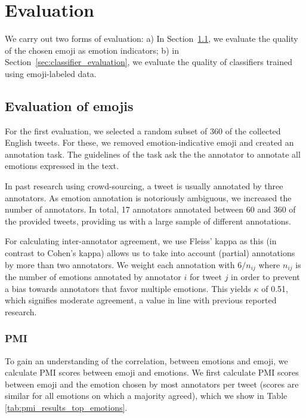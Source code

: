 \documentclass[10pt, a4paper]{article}
\begin{document}
\section{Evaluation}
\label{sec:evaluation}
We carry out two forms of evaluation: a) In Section~\ref{sec:emoji_evaluation}, we evaluate the quality of the chosen emoji as emotion indicators; b) in Section~\ref{sec:classifier_evaluation}, we evaluate the quality of classifiers trained using emoji-labeled data.

\subsection{Evaluation of emojis}
\label{sec:emoji_evaluation}

For the first evaluation, we selected a random subset of 360 of the collected English tweets. For these, we removed emotion-indicative emoji and created an annotation task. The guidelines of the task ask the the annotator to annotate all emotions expressed in the text.

In past research using crowd-sourcing, a tweet is usually annotated by three annotators. As emotion annotation is notoriously ambiguous, we increased the number of annotators. In total, 17 annotators annotated between 60 and 360 of the provided tweets, providing us with a large sample of different annotations.

For calculating inter-annotator agreement, we use Fleiss' kappa as this (in contrast to Cohen's kappa) allows us to take into account (partial) annotations by more than two annotators. We weight each annotation with $ 6 / n_{ij}$ where $n_{ij}$ is the number of emotions annotated by annotator $i$ for tweet $j$ in order to prevent a bias towards annotators that favor multiple emotions. This yields $\kappa$ of 0.51, which signifies moderate agreement, a value in line with previous reported research.

\subsubsection{PMI}

To gain an understanding of the correlation, between emotions and emoji, we calculate PMI scores between emoji and emotions. We first calculate PMI scores between emoji and the emotion chosen by most annotators per tweet (scores are similar for all emotions on which a majority agreed), which we show in Table \ref{tab:pmi_results_top_emotions}.
\end{document}
